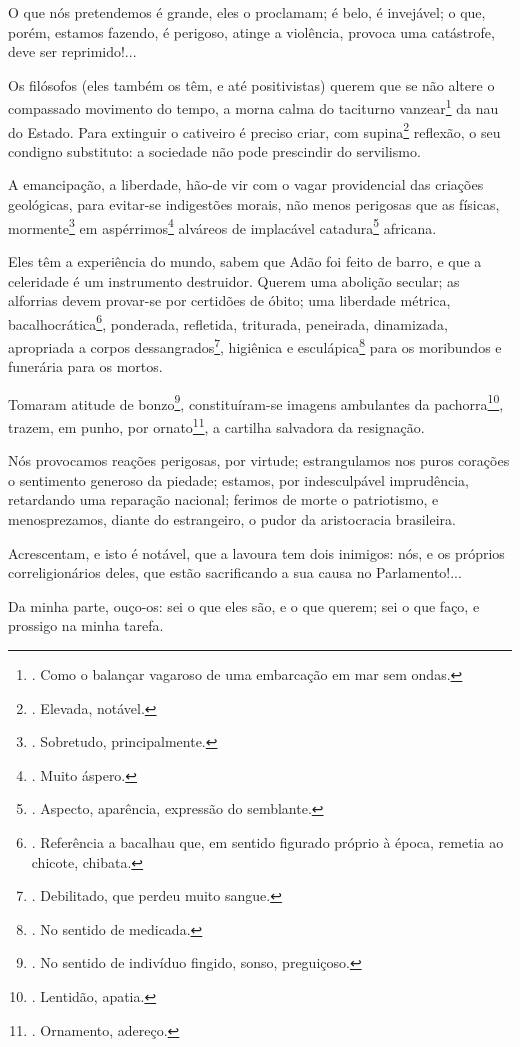 O que nós pretendemos é grande, eles o proclamam; é belo, é invejável; o
que, porém, estamos fazendo, é perigoso, atinge a violência, provoca uma
catástrofe, deve ser reprimido!...

Os filósofos (eles também os têm, e até positivistas) querem que se não
altere o compassado movimento do tempo, a morna calma do taciturno
vanzear\footnote{. Como o balançar vagaroso de uma embarcação em mar sem
  ondas.} da nau do Estado. Para extinguir o cativeiro é preciso criar,
com supina\footnote{. Elevada, notável.} reflexão, o seu condigno
substituto: a sociedade não pode prescindir do servilismo.

A emancipação, a liberdade, hão-de vir com o vagar providencial das
criações geológicas, para evitar-se indigestões morais, não menos
perigosas que as físicas, mormente\footnote{. Sobretudo, principalmente.}
em aspérrimos\footnote{. Muito áspero.} alváreos de implacável
catadura\footnote{. Aspecto, aparência, expressão do semblante.}
africana.

Eles têm a experiência do mundo, sabem que Adão foi feito de barro, e
que a celeridade é um instrumento destruidor. Querem uma abolição
secular; as alforrias devem provar-se por certidões de óbito; uma
liberdade métrica, bacalhocrática\footnote{. Referência a bacalhau que,
  em sentido figurado próprio à época, remetia ao chicote, chibata.},
ponderada, refletida, triturada, peneirada, dinamizada, apropriada a
corpos dessangrados\footnote{. Debilitado, que perdeu muito sangue.},
higiênica e esculápica\footnote{. No sentido de medicada.} para os
moribundos e funerária para os mortos.

Tomaram atitude de bonzo\footnote{. No sentido de indivíduo fingido,
  sonso, preguiçoso.}, constituíram-se imagens ambulantes da
pachorra\footnote{. Lentidão, apatia.}, trazem, em punho, por
ornato\footnote{. Ornamento, adereço.}, a cartilha salvadora da
resignação.

Nós provocamos reações perigosas, por virtude; estrangulamos nos puros
corações o sentimento generoso da piedade; estamos, por indesculpável
imprudência, retardando uma reparação nacional; ferimos de morte o
patriotismo, e menosprezamos, diante do estrangeiro, o pudor da
aristocracia brasileira.

Acrescentam, e isto é notável, que a lavoura tem dois inimigos: nós, e
os próprios correligionários deles, que estão sacrificando a sua causa
no Parlamento!...

Da minha parte, ouço-os: sei o que eles são, e o que querem; sei o que
faço, e prossigo na minha tarefa.

